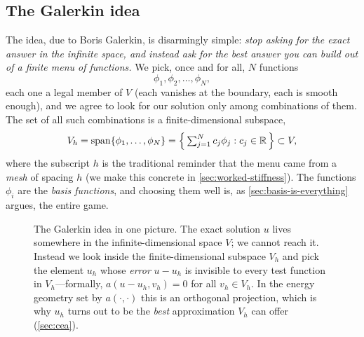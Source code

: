 \subsection{The Galerkin idea}

The idea, due to Boris Galerkin, is disarmingly simple: \emph{stop asking for the
exact answer in the infinite space, and instead ask for the best answer you can
build out of a finite menu of functions.} We pick, once and for all, $N$
functions
\[
\phi_1,\phi_2,\dots,\phi_N,
\]
each one a legal member of $V$ (each vanishes at the boundary, each is smooth
enough), and we agree to look for our solution only among combinations of them.
The set of all such combinations is a finite-dimensional subspace,
\begin{equation}
V_h=\operatorname{span}\{\phi_1,\dots,\phi_N\}
=\Bigl\{\,\textstyle\sum_{j=1}^N c_j\phi_j : c_j\in\mathbb{R}\,\Bigr\}\subset V,
\label{eq:Vh}
\end{equation}
where the subscript $h$ is the traditional reminder that the menu came from a
\emph{mesh} of spacing $h$ (we make this concrete in \cref{sec:worked-stiffness}).
The functions $\phi_i$ are the \emph{basis functions}, and choosing them well is,
as \cref{sec:basis-is-everything} argues, the entire game.

\begin{figure}[t]
\centering
{}
\caption[The Galerkin projection]{The Galerkin idea in one picture. The exact
solution $u$ lives somewhere in the infinite-dimensional space $V$; we cannot
reach it. Instead we look inside the finite-dimensional subspace $V_h$ and pick
the element $u_h$ whose \emph{error} $u-u_h$ is invisible to every test function
in $V_h$---formally, $a(u-u_h,v_h)=0$ for all $v_h\in V_h$. In the energy
geometry set by $a(\cdot,\cdot)$ this is an orthogonal projection, which is why
$u_h$ turns out to be the \emph{best} approximation $V_h$ can offer
(\cref{sec:cea}).}
\label{fig:galerkin-projection}
\end{figure}

